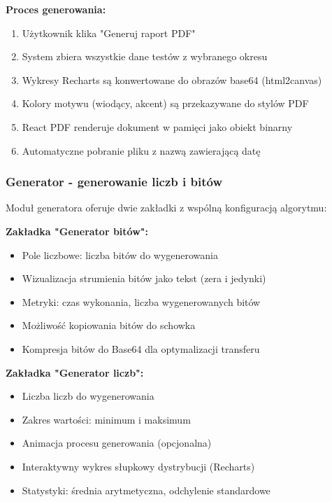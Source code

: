 \documentclass[12pt,a4paper]{article}
\begin{document}
\textbf{Proces generowania:}
\begin{enumerate}
    \item Użytkownik klika "Generuj raport PDF"
    \item System zbiera wszystkie dane testów z wybranego okresu
    \item Wykresy Recharts są konwertowane do obrazów base64 (html2canvas)
    \item Kolory motywu (wiodący, akcent) są przekazywane do stylów PDF
    \item React PDF renderuje dokument w pamięci jako obiekt binarny
    \item Automatyczne pobranie pliku z nazwą zawierającą datę
\end{enumerate}

\subsubsection{Generator - generowanie liczb i bitów}

Moduł generatora oferuje dwie zakładki z wspólną konfiguracją algorytmu:

\textbf{Zakładka "Generator bitów":}
\begin{itemize}
    \item Pole liczbowe: liczba bitów do wygenerowania
    \item Wizualizacja strumienia bitów jako tekst (zera i jedynki)
    \item Metryki: czas wykonania, liczba wygenerowanych bitów
    \item Możliwość kopiowania bitów do schowka
    \item Kompresja bitów do Base64 dla optymalizacji transferu
\end{itemize}

\textbf{Zakładka "Generator liczb":}
\begin{itemize}
    \item Liczba liczb do wygenerowania
    \item Zakres wartości: minimum i maksimum
    \item Animacja procesu generowania (opcjonalna)
    \item Interaktywny wykres słupkowy dystrybucji (Recharts)
    \item Statystyki: średnia arytmetyczna, odchylenie standardowe
\end{itemize}
\end{document}
